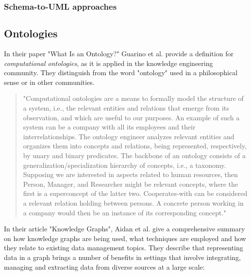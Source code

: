 \subsubsection{Schema-to-UML approaches}\label{subsubsec:schema-to-uml}

\subsection{Ontologies}
In their paper "What Is an Ontology?" Guarino et al. provide a definition for \textit{computational ontologies}, as it is applied in the knowledge engineering community.
They distinguish from the word "ontology" used in a philosophical sense or in other communities.\cite{guarino2009ontology}
\begin{quote}
	"Computational ontologies are a means to formally model the structure of a system, i.e., the relevant entities and relations that emerge from its observation, and which are useful to our purposes. An example of such a system can be a company with all its employees and their interrelationships. The ontology engineer analyzes relevant entities and organizes them into concepts and relations, being represented, respectively, by unary and binary predicates. The backbone of an ontology consists of a generalization/specialization hierarchy of concepts, i.e., a taxonomy. Supposing we are interested in aspects related to human resources, then Person, Manager, and Researcher might be relevant concepts, where the first is a superconcept of the latter two. Cooperates-with can be considered a relevant relation holding between persons. A concrete person working in a company would then be an instance of its corresponding concept."\cite{guarino2009ontology}
\end{quote}

In their article "Knowledge Graphs", Aidan et al. \cite{hogan2021knowledge} give a comprehensive summary on how knowledge graphs are being used, what techniques are employed and how they relate to existing data management topics.
They describe that representing data in a graph brings a number of benefits in settings that involve integrating, managing and extracting data from diverse sources at a large scale:

